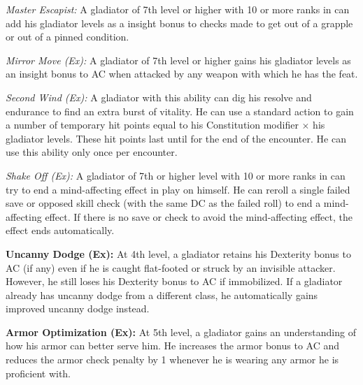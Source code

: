\textit{Master Escapist:} A gladiator of 7th level or higher with 10 or more ranks in  can add \onehalf his gladiator levels as a insight bonus to  checks made to get out of a grapple or out of a pinned condition.

\textit{Mirror Move (Ex):} A gladiator of 7th level or higher gains \onequarter his gladiator levels as an insight bonus to AC when attacked by any weapon with which he has the  feat.

\textit{Second Wind (Ex):} A gladiator with this ability can dig his resolve and endurance to find an extra burst of vitality. He can use a standard action to gain a number of temporary hit points equal to his Constitution modifier $\times$ his gladiator levels. These hit points last until for the end of the encounter. He can use this ability only once per encounter.

\textit{Shake Off (Ex):} A gladiator of 7th or higher level with 10 or more ranks in  can try to end a mind-affecting effect in play on himself. He can reroll a single failed save or opposed skill check (with the same DC as the failed roll) to end a mind-affecting effect. If there is no save or check to avoid the mind-affecting effect, the effect ends automatically.


\textbf{Uncanny Dodge (Ex):} At 4th level, a gladiator retains his Dexterity bonus to AC (if any) even if he is caught flat-footed or struck by an invisible attacker. However, he still loses his Dexterity bonus to AC if immobilized. If a gladiator already has uncanny dodge from a different class, he automatically gains improved uncanny dodge instead.

\textbf{Armor Optimization (Ex):} At 5th level, a gladiator gains an understanding of how his armor can better serve him. He increases the armor bonus to AC and reduces the armor check penalty by 1 whenever he is wearing any armor he is proficient with.

